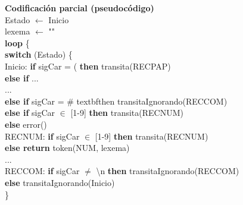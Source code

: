 \documentclass[\main/Apuntes_PL.tex]{subfiles}
\begin{document}
      \newpage
      \par \noindent
      \textbf{Codificación parcial (pseudocódigo)}\\
      \vspace{5mm}
      \hspace{5mm}Estado $\leftarrow$ Inicio\\
      \hspace{5mm}lexema $\leftarrow$ ""\\
      \hspace{5mm}\textbf{loop} \{\\
      \hspace{10mm}\textbf{switch} (Estado) \{\\
      \hspace{10mm}Inicio: \textbf{if} sigCar = ( \textbf{then} transita(RECPAP)\\
      \hspace{22mm}\textbf{else if} ...\\
      \hspace{22mm}...\\
      \hspace{22mm}\textbf{else if} sigCar = \# textbf{then} transitaIgnorando(RECCOM)\\
      \hspace{22mm}\textbf{else if} sigCar $\in$ [1-9] \textbf{then} transita(RECNUM)\\
      \hspace{22mm}\textbf{else} error()\\
      \vspace{2mm}
      \hspace{10mm}RECNUM: \textbf{if} sigCar $\in$ [1-9] \textbf{then} transita(RECNUM)\\
      \hspace{30mm}\textbf{else return} token(NUM, lexema)\\
      \vspace{2mm}
      \hspace{10mm}...\\
      \vspace{2mm}
      \hspace{10mm}RECCOM: \textbf{if} sigCar $\neq$ \textbackslash n \textbf{then} transitaIgnorando(RECCOM)\\
      \hspace{30mm}\textbf{else} transitaIgnorando(Inicio)\\
      \hspace{10mm}\}\\
\end{document}
